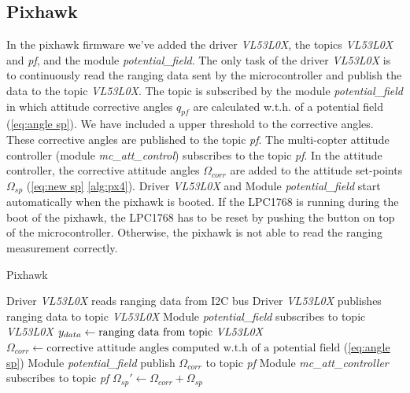 \subsection{Pixhawk}
\label{subs:pixhawk}
In the pixhawk firmware we've added the driver \textit{VL53L0X}, the topics \textit{VL53L0X} and \textit{pf}, and the module \textit{potential\_field}. The only task of the driver \textit{VL53L0X} is to continuously read the ranging data sent by the microcontroller and publish the data to the topic \textit{VL53L0X}. The topic is subscribed by the module \textit{potential\_field} in which attitude corrective angles $q_{pf}$ are calculated w.t.h. of a potential field (\cref{eq:angle sp}). We have included a upper threshold to the corrective angles. These corrective angles are published to the topic \textit{pf}. The multi-copter attitude controller (module \textit{mc\_att\_control}) subscribes to the topic \textit{pf}. In the attitude controller, the corrective attitude angles $\Omega_{corr}$ are added to the attitude set-points $\Omega_{sp}$ (\cref{eq:new sp} \cref{alg:px4}). Driver \textit{VL53L0X} and Module \textit{potential\_field} start automatically when the pixhawk is booted. If the LPC1768 is running during the boot of the pixhawk, the LPC1768 has to be reset by pushing the button on top of the microcontroller. Otherwise, the pixhawk is not able to read the ranging measurement correctly. 

\begin{algorithm}
	\caption{Pixhawk}\label{alg:px4}
	\begin{algorithmic}[1]
		\State Driver  \textit{VL53L0X} reads ranging data from I2C bus 
		\State Driver  \textit{VL53L0X} publishes ranging data to topic \textit{VL53L0X}
		\State Module \textit{potential\_field} subscribes to topic \textit{VL53L0X}
		\State $y_{data}\gets \text{ranging data from topic \textit{VL53L0X}}$
		\State $\Omega_{corr} \gets \text{corrective attitude angles computed w.t.h of a potential field}$ (\cref{eq:angle sp})
		\State Module \textit{potential\_field} publish $\Omega_{corr}$ to topic \textit{pf}
		\State Module \textit{mc\_att\_controller} subscribes to topic \textit{pf}
		\State $\Omega_{sp}'\gets \Omega_{corr}+\Omega_{sp}$
		\EndProcedure
	\end{algorithmic}
\end{algorithm}


